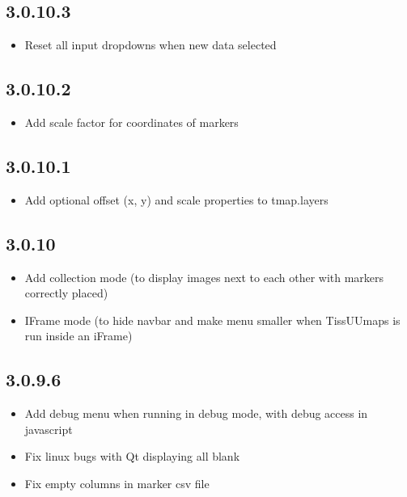 \documentclass[letterpaper,10pt,english,openany,oneside]{sphinxmanual}
\begin{document}
\subsection{3.0.10.3}
\label{\detokenize{docs/intro/versions:id26}}\begin{itemize}
\item {} 
\sphinxAtStartPar
Reset all input dropdowns when new data selected

\end{itemize}


\subsection{3.0.10.2}
\label{\detokenize{docs/intro/versions:id27}}\begin{itemize}
\item {} 
\sphinxAtStartPar
Add scale factor for coordinates of markers

\end{itemize}


\subsection{3.0.10.1}
\label{\detokenize{docs/intro/versions:id28}}\begin{itemize}
\item {} 
\sphinxAtStartPar
Add optional offset (x, y) and scale properties to tmap.layers

\end{itemize}


\subsection{3.0.10}
\label{\detokenize{docs/intro/versions:id29}}\begin{itemize}
\item {} 
\sphinxAtStartPar
Add collection mode (to display images next to each other with markers correctly placed)

\item {} 
\sphinxAtStartPar
IFrame mode (to hide navbar and make menu smaller when TissUUmaps is run inside an iFrame)

\end{itemize}


\subsection{3.0.9.6}
\label{\detokenize{docs/intro/versions:id30}}\begin{itemize}
\item {} 
\sphinxAtStartPar
Add debug menu when running in debug mode, with debug access in javascript

\item {} 
\sphinxAtStartPar
Fix linux bugs with Qt displaying all blank

\item {} 
\sphinxAtStartPar
Fix empty columns in marker csv file

\end{itemize}
\end{document}

